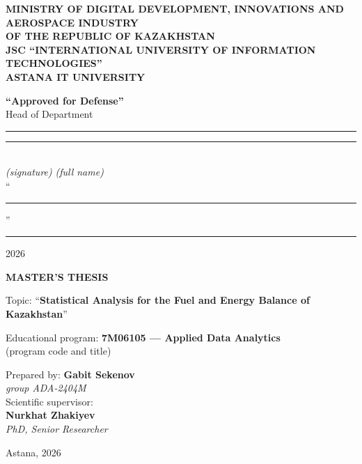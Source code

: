 \begin{titlepage}
\thispagestyle{empty}
\begin{center}

\textbf{MINISTRY OF DIGITAL DEVELOPMENT, INNOVATIONS AND}\\
\textbf{AEROSPACE INDUSTRY}\\
\textbf{OF THE REPUBLIC OF KAZAKHSTAN}\\[6pt]
\textbf{JSC ``INTERNATIONAL UNIVERSITY OF INFORMATION TECHNOLOGIES''}\\
\textbf{ASTANA IT UNIVERSITY}

\vfill

\textbf{``Approved for Defense''}\\[3pt]
Head of Department\\[3pt]
\rule{50mm}{0.4pt} \quad \rule{40mm}{0.4pt}\\[3pt]
\textit{(signature)} \hspace{2cm} \textit{(full name)}\\[3pt]
``\rule{15mm}{0.4pt}'' \rule{30mm}{0.4pt} 2026

\vfill

\textbf{MASTER'S THESIS}

\vspace{1.5cm}

Topic: ``\textbf{Statistical Analysis for the Fuel and Energy Balance of Kazakhstan}''

\vspace{1cm}

Educational program: \textbf{7M06105 --- Applied Data Analytics}\\
(program code and title)

\vfill

\begin{flushleft}
\hspace{6cm} Prepared by: \quad \textbf{Gabit Sekenov}\\
\hspace{6cm} \textit{group ADA-2404M}\\[1cm]
\hspace{6cm} Scientific supervisor:\\
\hspace{6cm} \textbf{Nurkhat Zhakiyev}\\
\hspace{6cm} \textit{PhD, Senior Researcher}
\end{flushleft}

\vfill

Astana, 2026

\end{center}
\end{titlepage}
